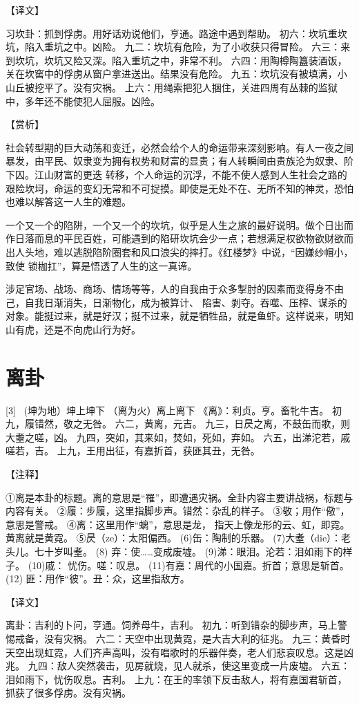 \documentclass[12pt,UTF8]{ctexbook}
\begin{document}
【译文】

习坎卦：抓到俘虏。用好话劝说他们，亨通。路途中遇到帮助。
初六：坎坑重坎坑，陷入重坑之中。凶险。
九二：坎坑有危险，为了小收获只得冒险。
六三：来到坎坑，坎坑又险又深。陷入重坑之中，非常不利。
六四：用陶樽陶簋装酒饭，关在坎窖中的俘虏从窗户拿进送出。结果没有危险。
九五：坎坑没有被填满，小山丘被挖平了。没有灾祸。
上六：用绳索把犯人捆住，关进四周有丛棘的监狱中，多年还不能使犯人屈服。凶险。

【赏析】

社会转型期的巨大动荡和变迁，必然会给个人的命运带来深刻影响。有人一夜之间暴发，由平民、奴隶变为拥有权势和财富的显贵；有人转瞬间由贵族沦为奴隶、阶下囚。江山财富的更迭 转移，个人命运的沉浮，不能不使人感到人生社会之路的艰险坎坷，命运的变幻无常和不可捉摸。即使是无处不在、无所不知的神灵，恐怕也难以解答这一人生的难题。

一个又一个的陷阱，一个又一个的坎坑，似乎是人生之旅的最好说明。做个日出而作日落而息的平民百姓，可能遇到的陷研坎坑会少一点；若想满足权欲物欲财欲而出人头地，难以逃脱陷阶圈套和风口浪尖的摔打。《红楼梦》中说，“因嫌纱帽小，致使 锁枷扛”，算是悟透了人生的这一真谛。

涉足官场、战场、商场、情场等等，人的自我由于众多掣肘的因素而变得身不由己，自我日渐消失，日渐物化，成为被算计、 陷害、剥夺。吞噬、压榨、谋杀的对象。能挺过来，就是好汉；挺不过来，就是牺牲品，就是鱼虾。这样说来，明知山有虎，还是不向虎山行为好。

\chapter{离卦}
[3] \ (坤为地）坤上坤下
（离为火）离上离下
《离》：利贞。亨。畜牝牛吉。
初九，履错然，敬之无咎。
六二，黄离，元吉。
九三，日昃之离，不鼓缶而歌，则大耋之嗟，凶。
九四，突如，其来如，焚如，死如，弃如。
六五，出涕沱若，戚嗟若，吉。
上九，王用出征，有嘉折首，获匪其丑，无咎。

【注释】

①离是本卦的标题。离的意思是“罹”，即遭遇灾祸。全卦内容主要讲战祸，标题与内容有关。
②履：步履，这里指脚步声。错然：杂乱的样子。
③敬；用作“儆”，意思是警戒。
④离：这里用作“螭”，意思是龙， 指天上像龙形的云、虹，即霓。黄离就是黄霓。
⑤昃（ze）：太阳偏西。
(6)缶：陶制的乐器。
(7)大耊（die）：老头儿。七十岁叫耊。
(8) 弃：使……变成废墟。
(9)涕：眼泪。沦若：泪如雨下的样子。
(10)戚： 忧伤。嗟：叹息。
(11)有嘉：周代的小国嘉。折首；意思是斩首。
(12) 匪：用作“彼”。丑：众，这里指敌方。

【译文】

离卦：吉利的卜问，亨通。饲养母牛，吉利。
初九：听到错杂的脚步声，马上警惕戒备，没有灾祸。
六二：天空中出现黄霓，是大吉大利的征兆。
九三：黄昏时天空出现虹霓，人们齐声高叫，没有唱歌时的乐器伴奏，老人们悲哀叹息。这是凶兆。
九四：敌人突然袭击，见房就烧，见人就杀，使这里变成一片废墟。
六五：泪如雨下，忧伤叹息。吉利。
上九：在王的率领下反击敌人，将有嘉国君斩首，抓获了很多俘虏。没有灾祸。
\end{document}
